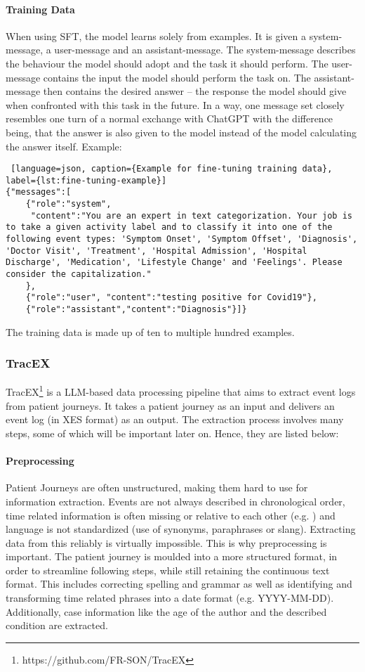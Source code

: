 \paragraph{Training Data}
When using SFT, the model learns solely from examples. It is given a system-message, a user-message and an assistant-message. The system-message describes the behaviour the model should adopt and the task it should perform. The user-message contains the input the model should perform the task on. The assistant-message then contains the desired answer – the response the model should give when confronted with this task in the future.
In a way, one message set closely resembles one turn of a normal exchange with ChatGPT with the difference being, that the answer is also given to the model instead of the model calculating the answer itself.
Example:
\begin{lstlisting} [language=json, caption={Example for fine-tuning training data}, label={lst:fine-tuning-example}]   
{"messages":[
    {"role":"system",
     "content":"You are an expert in text categorization. Your job is to take a given activity label and to classify it into one of the following event types: 'Symptom Onset', 'Symptom Offset', 'Diagnosis', 'Doctor Visit', 'Treatment', 'Hospital Admission', 'Hospital Discharge', 'Medication', 'Lifestyle Change' and 'Feelings'. Please consider the capitalization."
    },
    {"role":"user", "content":"testing positive for Covid19"},
    {"role":"assistant","content":"Diagnosis"}]}
\end{lstlisting}
The training data is made up of ten to multiple hundred examples.

\subsubsection*{TracEX}\label{sec:tracex}
TracEX\footnote{https://github.com/FR-SON/TracEX} is a LLM-based data processing pipeline that aims to extract event logs from patient journeys. It takes a patient journey as an input and delivers an event log (in XES format) as an output. The extraction process involves many steps, some of which will be important later on. Hence, they are listed below:
\paragraph{Preprocessing} Patient Journeys are often unstructured, making them hard to use for information extraction. Events are not always described in chronological order, time related information is often missing or relative to each other (e.g. ) and language is not standardized (use of synonyms, paraphrases or slang). Extracting data from this reliably is virtually impossible. This is why preprocessing is important. The patient journey is moulded into a more structured format, in order to streamline following steps, while still retaining the continuous text format. This includes correcting spelling and grammar as well as identifying and transforming time related phrases into a date format (e.g. YYYY-MM-DD). Additionally, case information like the age of the author and the described condition are extracted.
